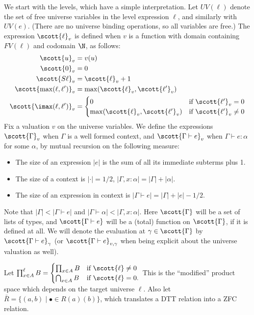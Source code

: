 We start with the levels, which have a simple interpretation. Let $UV(\ell)$ denote the set of free universe variables in the level expression $\ell$, and similarly with $UV(e)$. (There are no universe binding operations, so all variables are free.) The expression $\scott{\ell}_v$ is defined when $v$ is a function with domain containing $FV(\ell)$ and codomain $\N$, as follows:
\begin{align*}
\scott{u}_v&=v(u)\\
\scott{0}_v&=0\\
\scott{S\ell}_v&=\scott{\ell}_v+1\\
\scott{\max(\ell,\ell')}_v&=\max(\scott{\ell}_v,\scott{\ell'}_v)\\
\scott{\imax(\ell,\ell')}_v&=\begin{cases}
0&\mbox{if }\scott{\ell'}_v=0\\
\max(\scott{\ell}_v,\scott{\ell'}_v)&\mbox{if }\scott{\ell'}_v\ne 0
\end{cases}
\end{align*}
Fix a valuation $v$ on the universe variables. We define the expressions $\scott{\Gamma}_v$ when $\Gamma$ is a well formed context, and $\scott{\Gamma\vdash e}_v$ when $\Gamma\vdash e:\alpha$ for some $\alpha$, by mutual recursion on the following measure:
\begin{itemize}
\item The size of an expression $|e|$ is the sum of all its immediate subterms plus 1.
\item The size of a context is $|{\cdot}|=1/2$, $|\Gamma,x:\alpha|=|\Gamma|+|\alpha|$.
\item The size of an expression in context is $|\Gamma\vdash e|=|\Gamma|+|e|-1/2$.
\end{itemize}
Note that $|\Gamma|<|\Gamma\vdash e|$ and $|\Gamma\vdash\alpha|<|\Gamma,x:\alpha|$. Here $\scott{\Gamma}$ will be a set of lists of types, and $\scott{\Gamma\vdash e}$ will be a (total) function on $\scott{\Gamma}$, if it is defined at all. We will denote the evaluation at $\gamma\in\scott{\Gamma}$ by $\scott{\Gamma\vdash e}_\gamma$ (or $\scott{\Gamma\vdash e}_{v,\gamma}$ when being explicit about the universe valuation as well).

Let $\prod^\ell_{x\in A}B=\begin{cases}
\prod_{x\in A}B&\mbox{if }\scott{\ell}\ne 0\\
\bigcap_{x\in A}B&\mbox{if }\scott{\ell}=0.
\end{cases}$ This is the ``modified'' product space which depends on the target universe $\ell$. Also let $\bar R=\{(a,b)\mid\bullet\in R(a)(b)\}$, which translates a DTT relation into a ZFC relation.

